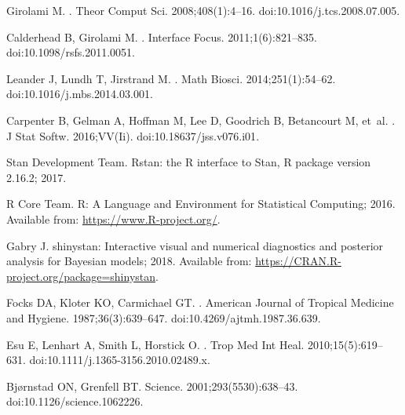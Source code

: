 \documentclass[10pt,letterpaper]{article}
\begin{document}
\begin{thebibliography}{10}
Girolami M.
.
\newblock Theor Comput Sci. 2008;408(1):4--16.
\newblock doi:{10.1016/j.tcs.2008.07.005}.

Calderhead B, Girolami M.
.
\newblock Interface Focus. 2011;1(6):821--835.
\newblock doi:{10.1098/rsfs.2011.0051}.

Leander J, Lundh T, Jirstrand M.
.
\newblock Math Biosci. 2014;251(1):54--62.
\newblock doi:{10.1016/j.mbs.2014.03.001}.

Carpenter B, Gelman A, Hoffman M, Lee D, Goodrich B, Betancourt M, et~al.
.
\newblock J Stat Softw. 2016;VV(Ii).
\newblock doi:{10.18637/jss.v076.i01}.

{Stan Development Team}. Rstan: the R interface to Stan, R package version
  2.16.2; 2017.

{R Core Team}. R: A Language and Environment for Statistical Computing; 2016.
\newblock Available from: \url{https://www.R-project.org/}.

Gabry J. shinystan: Interactive visual and numerical diagnostics and posterior
  analysis for Bayesian models; 2018.
\newblock Available from: \url{https://CRAN.R-project.org/package=shinystan}.

Focks DA, Kloter KO, Carmichael GT.
.
\newblock American Journal of Tropical Medicine and Hygiene.
  1987;36(3):639--647.
\newblock doi:{10.4269/ajtmh.1987.36.639}.

Esu E, Lenhart A, Smith L, Horstick O.
.
\newblock Trop Med Int Heal. 2010;15(5):619--631.
\newblock doi:{10.1111/j.1365-3156.2010.02489.x}.

Bj{\o}rnstad ON, Grenfell BT.
\newblock Science. 2001;293(5530):638--43.
\newblock doi:{10.1126/science.1062226}.


\end{thebibliography}
\end{document}
